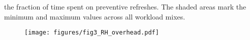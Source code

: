 the fraction
of  time spent on preventive refreshes.
The shaded areas mark the minimum and maximum values across all workload mixes.
\vspace{10pt}
\begin{figure}[ht]
\centering
\texttt{[image: figures/fig3\_RH\_overhead.pdf]}
\caption{}
\label{fig:performance_motivation}
\end{figure}


